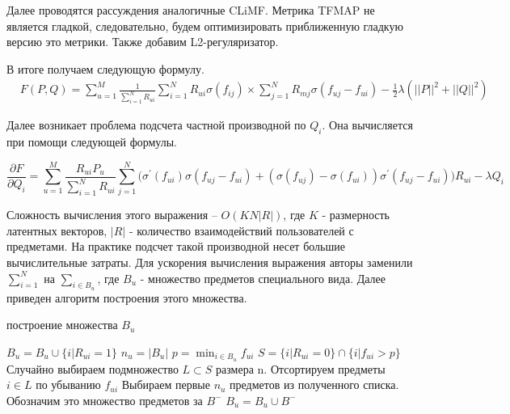 \documentclass[a4paper,12pt]{article}
\begin{document}
 Далее проводятся рассуждения аналогичные CLiMF. Метрика TFMAP  не является гладкой, следовательно, будем оптимизировать приближенную гладкую версию это метрики. Также добавим L2-регуляризатор.
 
 В итоге получаем  следующую формулу.
 \begin{equation*}
 \begin{split}
 & F(P, Q) = \sum_{u=1}^M \frac{1}{\sum_{i=1}^N R_{ui}} \sum_{i=1}^N R_{ui} \sigma(f_{ij}) \times \sum_{j=1}^N R_{mj} \sigma(f_{uj} - f_{ui}) - \frac{1}{2}\lambda({||P||}^2 + {||Q||}^2)
 \end{split}
 \end{equation*}

Далее возникает проблема подсчета частной производной по $Q_i$. Она вычисляется при помощи следующей формулы. 

\begin{equation*}
 \frac{\partial F}{\partial Q_i} = \sum_{u=1}^M\frac{R_{ui} P_u}{\sum_{i=1}^N R_{ui}}\sum_{j=1}^N \Big(\sigma^{\prime}( f_{ui})\sigma(f_{uj} - f_{ui}) + (\sigma(f_{uj}) - \sigma(f_{ui}))\sigma^{\prime}(f_{uj} - f_{ui}) \Big )  R_{ui} - \lambda Q_i
\end{equation*}

Сложность вычисления этого выражения -- $O(KN|R|)$, где $K$ - размерность латентных векторов, $|R|$ -  количество взаимодействий пользователей с предметами. На практике подсчет такой производной несет большие вычислительные затраты. Для ускорения вычисления выражения авторы заменили $\sum_{i=1}^N$ на $\sum_{i \in B_{u}}$, где $B_{u}$ - множество предметов специального вида. Далее приведен алгоритм построения этого множества.

\begin{algorithm}[h]
\caption{построение множества $B_{u}$}
\begin{algorithmic}[1]
\State $B_u = B_u \cup \{i | R_{ui} = 1 \}$
\State $n_u = |B_u|$
\State $p = \min_{i \in B_u} f_{ui}$
\State $S  = \{i |R_{ui} = 0 \} \cap \{i| f_{ui} > p \}$
\State Случайно выбираем подмножество $L \subset S$ размера n.
\State Отсортируем предметы $i \in L$ по убыванию $f_{ui}$
\State Выбираем первые $n_u$ предметов из полученного списка. Обозначим это множество предметов за $B^{-}$
\State $B_u = B_u \cup B^{-}$  
\end{algorithmic}
\label{alg:setB}
\end{algorithm}
\end{document}

